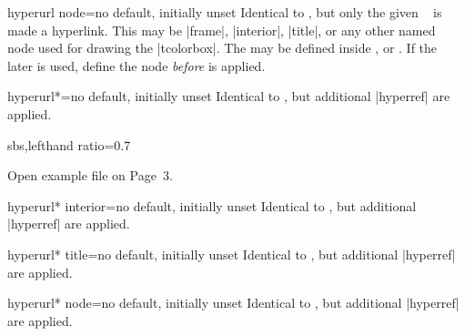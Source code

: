 \begin{docTcbKey}[][doc new=2017-02-03]{hyperurl node}{=}{no default, initially unset}
  Identical to , but only the given \tikzname\ 
  is made a hyperlink. This  may be |frame|, |interior|, |title|, or
  any other named node used for drawing the |tcolorbox|.
  The  may be defined inside
  ,  or .
  If the later is used, define the node \emph{before} 
  is applied.
\end{docTcbKey}


\begin{docTcbKey}[][doc new=2017-02-03]{hyperurl*}{=}{no default, initially unset}
  Identical to , but additional |hyperref| \cite{rahtz:hyperref}
   are applied.
  \begin{dispExample*}{sbs,lefthand ratio=0.7}
\begin{tcolorbox}[enhanced,colback=green!50,
  hyperurl*={page=3,pdfnewwindow=true}%
            {tcolorbox-example.pdf}]
Open example file on Page~3.
\end{tcolorbox}
  \end{dispExample*}
\end{docTcbKey}

\begin{docTcbKey}[][doc new=2017-02-03]{hyperurl* interior}{=}{no default, initially unset}
  Identical to , but additional |hyperref| \cite{rahtz:hyperref}
   are applied.
\end{docTcbKey}

\begin{docTcbKey}[][doc new=2017-02-03]{hyperurl* title}{=}{no default, initially unset}
  Identical to , but additional |hyperref| \cite{rahtz:hyperref}
   are applied.
\end{docTcbKey}

\enlargethispage*{1cm}

\begin{docTcbKey}[][doc new=2017-02-03]{hyperurl* node}{=}{no default, initially unset}
  Identical to , but additional |hyperref| \cite{rahtz:hyperref}
   are applied.
\end{docTcbKey}



